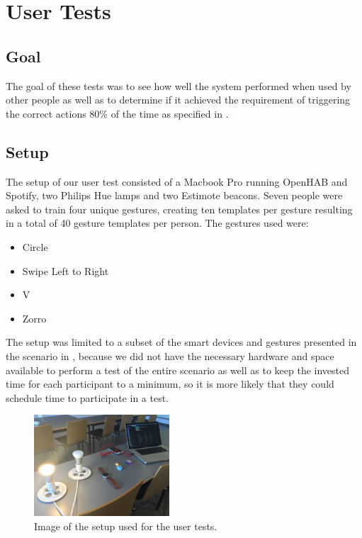 \section{User Tests}
\label{sec:evaluation:user-tests}

\subsection{Goal}

The goal of these tests was to see how well the system performed when used by other people as well as to determine if it achieved the requirement of triggering the correct actions 80\% of the time as specified in .

\subsection{Setup}
\label{sec:evaluation:user-tests-setup}

The setup of our user test consisted of a Macbook Pro running OpenHAB and Spotify, two Philips Hue lamps and two Estimote beacons.
Seven people were asked to train four unique gestures, creating ten templates per gesture resulting in a total of 40 gesture templates per person.
The gestures used were:

\begin{itemize}
  \item Circle
  \item Swipe Left to Right
  \item V
  \item Zorro
\end{itemize}

The setup was limited to a subset of the smart devices and gestures presented in the scenario in , because we did not have the necessary hardware and space available to perform a test of the entire scenario as well as to keep the invested time for each participant to a minimum, so it is more likely that they could schedule time to participate in a test.

\begin{figure}[h]
\centering
\includegraphics[width=0.45\textwidth]{images/user-test-setup.jpg}
\caption{Image of the setup used for the user tests.}
\label{fig:user-test-setup-image}
\end{figure}

